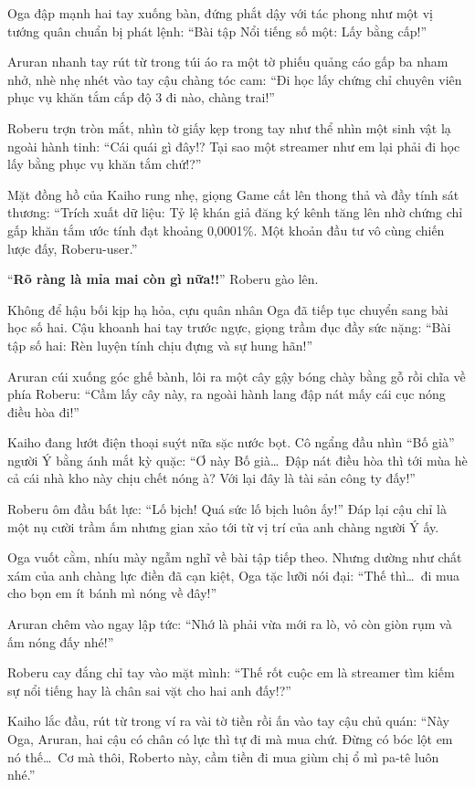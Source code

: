 \documentclass[../main.tex]{subfiles}
\begin{document}
Oga đập mạnh hai tay xuống bàn, đứng phắt dậy với tác phong như một vị tướng quân chuẩn bị phát lệnh: ``Bài tập Nổi tiếng số một: Lấy bằng cấp!''

Aruran nhanh tay rút từ trong túi áo ra một tờ phiếu quảng cáo gấp ba nham nhở, nhè nhẹ nhét vào tay cậu chàng tóc cam: ``Đi học lấy chứng chỉ chuyên viên phục vụ khăn tắm cấp độ 3 đi nào, chàng trai!''

Roberu trợn tròn mắt, nhìn tờ giấy kẹp trong tay như thể nhìn một sinh vật lạ ngoài hành tinh: ``Cái quái gì đây!? Tại sao một streamer như em lại phải đi học lấy bằng phục vụ khăn tắm chứ!?''

Mặt đồng hồ của Kaiho rung nhẹ, giọng Game cất lên thong thả và đầy tính sát thương: ``Trích xuất dữ liệu: Tỷ lệ khán giả đăng ký kênh tăng lên nhờ chứng chỉ gấp khăn tắm ước tính đạt khoảng 0,0001\%. Một khoản đầu tư vô cùng chiến lược đấy, Roberu-user.''

``\textbf{Rõ ràng là mỉa mai còn gì nữa!!}'' Roberu gào lên.

Không để hậu bối kịp hạ hỏa, cựu quân nhân Oga đã tiếp tục chuyển sang bài học số hai. Cậu khoanh hai tay trước ngực, giọng trầm đục đầy sức nặng: ``Bài tập số hai: Rèn luyện tính chịu đựng và sự hung hãn!''

Aruran cúi xuống góc ghế bành, lôi ra một cây gậy bóng chày bằng gỗ rồi chĩa về phía Roberu: ``Cầm lấy cây này, ra ngoài hành lang đập nát mấy cái cục nóng điều hòa đi!''

Kaiho đang lướt điện thoại suýt nữa sặc nước bọt. Cô ngẩng đầu nhìn ``Bố già'' người Ý bằng ánh mắt kỳ quặc: ``Ơ này Bố già\dots\ Đập nát điều hòa thì tới mùa hè cả cái nhà kho này chịu chết nóng à? Với lại đây là tài sản công ty đấy!''

Roberu ôm đầu bất lực: ``Lố bịch! Quá sức lố bịch luôn ấy!'' Đáp lại cậu chỉ là một nụ cười trầm ấm nhưng gian xảo tới từ vị trí của anh chàng người Ý ấy.

Oga vuốt cằm, nhíu mày ngẫm nghĩ về bài tập tiếp theo. Nhưng dường như chất xám của anh chàng lực điền đã cạn kiệt, Oga tặc lưỡi nói đại: ``Thế thì\dots\ đi mua cho bọn em ít bánh mì nóng về đây!''

Aruran chêm vào ngay lập tức: ``Nhớ là phải vừa mới ra lò, vỏ còn giòn rụm và ấm nóng đấy nhé!''

Roberu cay đắng chỉ tay vào mặt mình: ``Thế rốt cuộc em là streamer tìm kiếm sự nổi tiếng hay là chân sai vặt cho hai anh đấy!?''

Kaiho lắc đầu, rút từ trong ví ra vài tờ tiền rồi ấn vào tay cậu chủ quán: ``Này Oga, Aruran, hai cậu có chân có lực thì tự đi mà mua chứ. Đừng có bóc lột em nó thế\dots\ Cơ mà thôi, Roberto này, cầm tiền đi mua giùm chị ổ mì pa-tê luôn nhé.''
\end{document}
